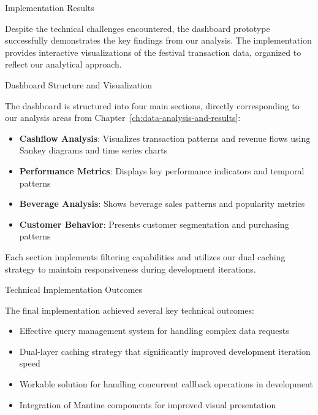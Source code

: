 \begin{section}{Implementation Results}
	\label{sec:implementation-results}

	Despite the technical challenges encountered, the dashboard prototype successfully demonstrates the key findings from our analysis. The implementation provides interactive visualizations of the festival transaction data, organized to reflect our analytical approach.

	\begin{subsection}{Dashboard Structure and Visualization}
		\label{subsec:implementation-results-structure}

		The dashboard is structured into four main sections, directly corresponding to our analysis areas from Chapter~\ref{ch:data-analysis-and-results}:

		\begin{itemize}
			\item \textbf{Cashflow Analysis}: Visualizes transaction patterns and revenue flows using Sankey diagrams and time series charts
			\item \textbf{Performance Metrics}: Displays key performance indicators and temporal patterns
			\item \textbf{Beverage Analysis}: Shows beverage sales patterns and popularity metrics
			\item \textbf{Customer Behavior}: Presents customer segmentation and purchasing patterns
		\end{itemize}

		Each section implements filtering capabilities and utilizes our dual caching strategy to maintain responsiveness during development iterations.

	\end{subsection}

	\begin{subsection}{Technical Implementation Outcomes}
		\label{subsec:implementation-results-technical}

		The final implementation achieved several key technical outcomes:

		\begin{itemize}
			\item Effective query management system for handling complex data requests
			\item Dual-layer caching strategy that significantly improved development iteration speed
			\item Workable solution for handling concurrent callback operations in development
			\item Integration of Mantine components for improved visual presentation
		\end{itemize}


\end{subsection}
\end{section}
